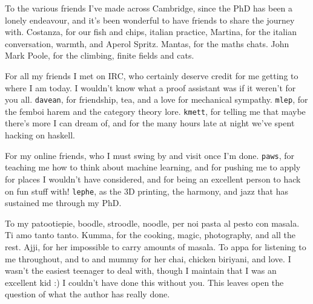 To the various friends I've made across Cambridge,
since the PhD has been a lonely endeavour, and it's been wonderful to have friends to share the journey with.
Costanza, for our fish and chips, italian practice, 
Martina, for the italian conversation, warmth, and Aperol Spritz.
Mantas, for the maths chats.
John Mark Poole, for the climbing, finite fields and cats.

For all my friends I met on IRC, who certainly deserve credit for me getting to where I am today.
I wouldn't know what a proof assistant was if it weren't for you all.
\texttt{davean}, for friendship, tea, and a love for mechanical sympathy.
\texttt{mlep}, for the femboi harem and the category theory lore.
\texttt{kmett}, for telling me that maybe there's more I can dream of,
and for the many hours late at night we've spent hacking on haskell.


For my online friends, who I must swing by and visit once I'm done.
\texttt{paws}, for teaching me how to think about machine learning,
and for pushing me to apply for places I wouldn't have considered,
and for being an excellent person to hack on fun stuff with!
\texttt{lephe}, as the 3D printing, the harmony, and jazz that has sustained me through my PhD.


To my patootiepie, boodle, stroodle, noodle, per noi pasta al pesto con masala. Ti amo tanto tanto.
Kumma, for the cooking, magic, photography, and all the rest. 
Ajji, for her impossible to carry amounts of masala.
To appa for listening to me throughout,
and to and mummy for her chai, chicken biriyani, and love.
I wasn't the easiest teenager to deal with, though I maintain that I was an excellent kid :)
I couldn't have done this without you.
This leaves open the question of what the author has really done.


